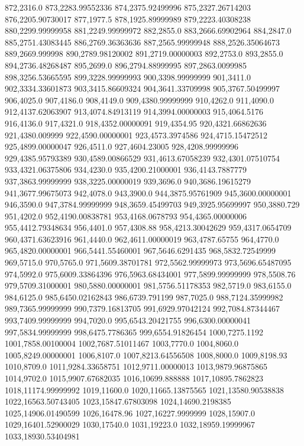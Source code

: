 872,2316.0
873,2283.99552336
874,2375.92499996
875,2327.26714203
876,2205.90730017
877,1977.5
878,1925.89999989
879,2223.40308238
880,2299.99999958
881,2249.99999972
882,2855.0
883,2666.69902964
884,2847.0
885,2751.43083445
886,2769.36363636
887,2565.99999948
888,2526.35064673
889,2669.999998
890,2789.98120002
891,2719.00000003
892,2753.0
893,2855.0
894,2736.48268487
895,2699.0
896,2794.88999995
897,2863.0099985
898,3256.53665595
899,3228.99999993
900,3398.99999999
901,3411.0
902,3334.33601873
903,3415.86609324
904,3641.33709998
905,3767.50499997
906,4025.0
907,4186.0
908,4149.0
909,4380.99999999
910,4262.0
911,4090.0
912,4137.62063907
913,4074.84913119
914,3994.00000003
915,4064.5176
916,4136.0
917,4321.0
918,4352.00000091
919,4354.95
920,4321.66862636
921,4380.009999
922,4590.00000001
923,4573.3974586
924,4715.15472512
925,4899.00000047
926,4511.0
927,4604.23005
928,4208.99999996
929,4385.95793389
930,4589.00866529
931,4613.67058239
932,4301.07510754
933,4321.06375806
934,4230.0
935,4200.21000001
936,4143.7887779
937,3863.99999999
938,3225.00000019
939,3696.0
940,3686.19615279
941,3677.99675073
942,4078.0
943,3900.0
944,3875.95761909
945,3600.00000001
946,3590.0
947,3784.99999999
948,3659.45499703
949,3925.95699997
950,3880.729
951,4202.0
952,4190.00838781
953,4168.0678793
954,4365.00000006
955,4412.79348634
956,4401.0
957,4308.88
958,4213.30042629
959,4317.0654709
960,4371.63623916
961,4440.0
962,4611.00000019
963,4787.65755
964,4770.0
965,4820.00000001
966,5441.55460001
967,5646.6291435
968,5832.72549999
969,5715.0
970,5765.0
971,5609.38701781
972,5562.99999973
973,5696.65487095
974,5992.0
975,6009.33864396
976,5963.68434001
977,5899.99999999
978,5508.76
979,5709.31000001
980,5880.00000001
981,5756.51178353
982,5719.0
983,6155.0
984,6125.0
985,6450.02162843
986,6739.791199
987,7025.0
988,7124.35999982
989,7365.99999999
990,7379.16813705
991,6929.97042124
992,7084.87344467
993,7409.99999999
994,7020.0
995,6543.20421755
996,6300.00000041
997,5834.99999999
998,6475.7786365
999,6554.91826454
1000,7275.1192
1001,7858.00100004
1002,7687.51011467
1003,7770.0
1004,8060.0
1005,8249.00000001
1006,8107.0
1007,8213.64556508
1008,8000.0
1009,8198.93
1010,8709.0
1011,9284.33658751
1012,9711.00000013
1013,9879.96875865
1014,9702.0
1015,9907.67682035
1016,10699.888888
1017,10895.7862823
1018,11174.99999992
1019,11600.0
1020,11665.13875565
1021,13580.90538838
1022,16563.50743405
1023,15847.67803098
1024,14690.2198385
1025,14906.01490599
1026,16478.96
1027,16227.9999999
1028,15907.0
1029,16401.52900029
1030,17540.0
1031,19223.0
1032,18959.19999967
1033,18930.53404981
